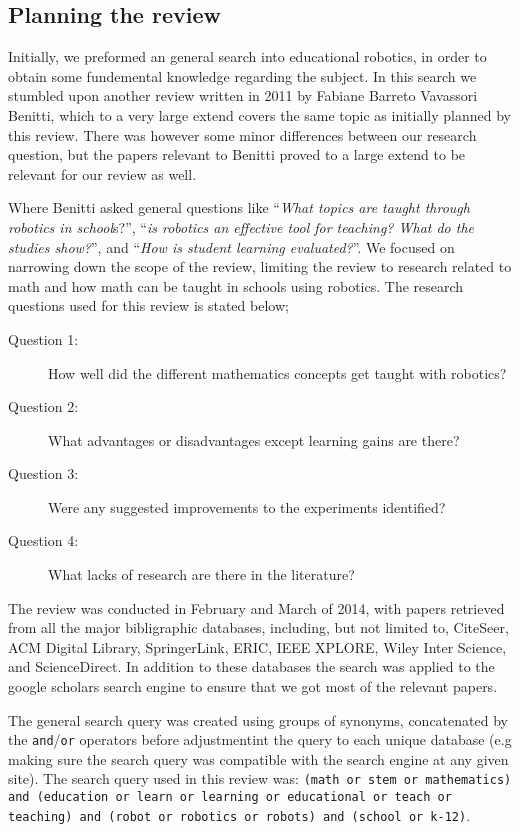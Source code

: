 \subsection{Planning the review}\label{sec:questions}
Initially, we preformed an general search into educational robotics, in order to obtain some fundemental knowledge regarding the subject. In this search we stumbled upon another review written in 2011 by Fabiane Barreto Vavassori Benitti\cite{Benitti2012978}, which to a very large extend covers the same topic as initially planned by this review. There was however some minor differences between our research question, but the papers relevant to Benitti proved to a large extend to be relevant for our review as well. 

\bigskip\noindent
Where Benitti asked general questions like "`\textit{What topics are taught through robotics in school}s?"', "`\textit{is robotics an effective tool for teaching? What do the studies show?}"', and "`\textit{How is student learning evaluated?}"'. We focused on narrowing down the scope of the review, limiting the review to research related to math and how math can be taught in schools using robotics.
The research questions used for this review is stated below; 
\begin{description}
	\item[Question 1: ] How well did the different mathematics concepts get taught with robotics?
	\item[Question 2: ] What advantages or disadvantages except learning gains are there?
	\item[Question 3: ] Were any suggested improvements to the experiments identified?
	\item[Question 4: ] What lacks of research are there in the literature?
\end{description}

\bigskip\noindent
The review was conducted in February and March of 2014, with papers retrieved from all the major bibligraphic databases, including, but not limited to, CiteSeer, ACM Digital Library, SpringerLink, ERIC, IEEE XPLORE, Wiley Inter Science, and ScienceDirect. In addition to these databases the search was applied to the google scholars search engine to ensure that we got most of the relevant papers.

\bigskip\noindent
The general search query was created using groups of synonyms, concatenated by the \texttt{and}/\texttt{or} operators before adjustmentint the query to each unique database (e.g making sure the search query was compatible with the search engine at any given site). The search query used in this review was: \texttt{(math or stem or mathematics) and (education or learn or learning or educational or teach or teaching) and (robot or robotics or robots) and (school or k-12)}. 

